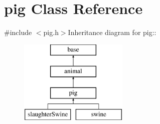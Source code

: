 \hypertarget{classpig}{
\section{pig Class Reference}
\label{classpig}
}


{\ttfamily \#include $<$pig.h$>$}Inheritance diagram for pig::\begin{figure}[H]
\begin{center}
\leavevmode
\includegraphics[height=4cm]{classpig}
\end{center}
\end{figure}
